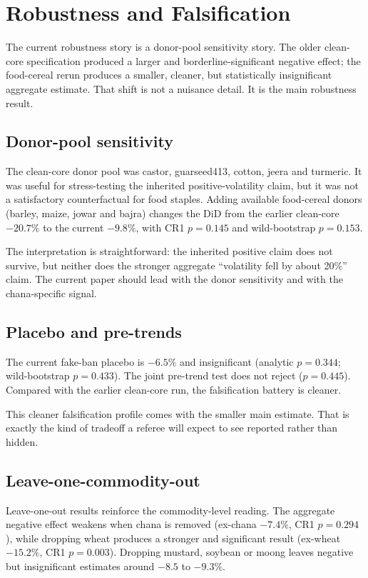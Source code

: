 \section{Robustness and Falsification}
\label{sec:robustness}

The current robustness story is a donor-pool sensitivity story. The older clean-core
specification produced a larger and borderline-significant negative effect; the food-cereal
rerun produces a smaller, cleaner, but statistically insignificant aggregate estimate.
That shift is not a nuisance detail. It is the main robustness result.

\subsection{Donor-pool sensitivity}

The clean-core donor pool was castor, guarseed413, cotton, jeera and turmeric. It was
useful for stress-testing the inherited positive-volatility claim, but it was not a
satisfactory counterfactual for food staples. Adding available food-cereal donors
(barley, maize, jowar and bajra) changes the DiD from the earlier clean-core $-20.7\%$
to the current $-9.8\%$, with CR1 $p=0.145$ and wild-bootstrap $p=0.153$.

The interpretation is straightforward: the inherited positive claim does not survive,
but neither does the stronger aggregate ``volatility fell by about 20\%'' claim. The
current paper should lead with the donor sensitivity and with the chana-specific signal.

\subsection{Placebo and pre-trends}

The current fake-ban placebo is $-6.5\%$ and insignificant (analytic $p=0.344$;
wild-bootstrap $p=0.433$). The joint pre-trend test does not reject ($p=0.445$).
Compared with the earlier clean-core run, the falsification battery is cleaner.

This cleaner falsification profile comes with the smaller main estimate. That is exactly
the kind of tradeoff a referee will expect to see reported rather than hidden.

\subsection{Leave-one-commodity-out}

Leave-one-out results reinforce the commodity-level reading. The aggregate negative
effect weakens when chana is removed (ex-chana $-7.4\%$, CR1 $p=0.294$), while dropping
wheat produces a stronger and significant result (ex-wheat $-15.2\%$, CR1 $p=0.003$).
Dropping mustard, soybean or moong leaves negative but insignificant estimates around
$-8.5$ to $-9.3\%$.

